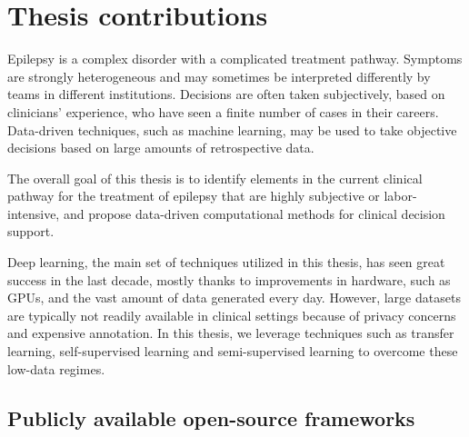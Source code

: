 \section{Thesis contributions}

Epilepsy is a complex disorder with a complicated treatment pathway.
Symptoms are strongly heterogeneous and may sometimes be interpreted differently by teams in different institutions.
Decisions are often taken subjectively, based on clinicians' experience, who have seen a finite number of cases in their careers.
Data-driven techniques, such as machine learning, may be used to take objective decisions based on large amounts of retrospective data.

The overall goal of this thesis is to identify elements in the current clinical pathway for the treatment of epilepsy that are highly subjective or labor-intensive, and propose data-driven computational methods for clinical decision support.

Deep learning, the main set of techniques utilized in this thesis, has seen great success in the last decade, mostly thanks to improvements in hardware, such as \acp{GPU}, and the vast amount of data generated every day.
However, large datasets are typically not readily available in clinical settings because of privacy concerns and expensive annotation.
In this thesis, we leverage techniques such as transfer learning, self-supervised learning and semi-supervised learning to overcome these low-data regimes.


\subsection{}

\subsection{}

\subsection{}

\subsection{Publicly available open-source frameworks}
